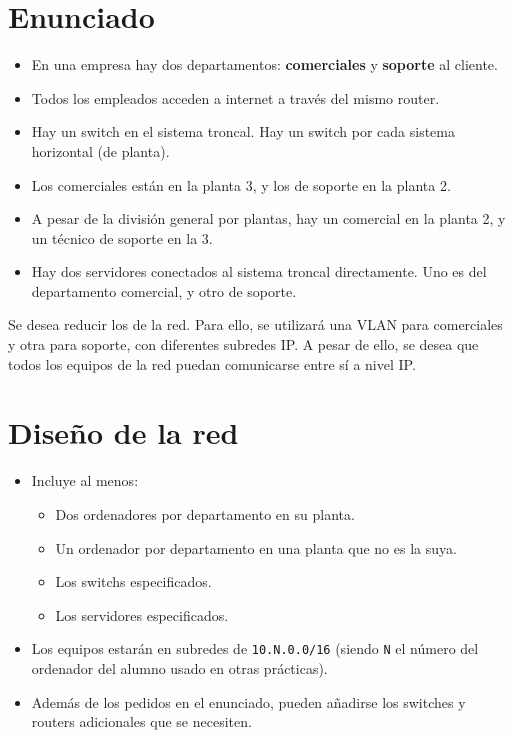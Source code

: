 \section{Enunciado}
\begin{itemize}
\item En una empresa hay dos departamentos: \textbf{comerciales} y \textbf{soporte} al cliente.
\item Todos los empleados acceden a internet a través del mismo router.
\item Hay un switch en el sistema troncal. Hay un switch por cada sistema horizontal (de planta).  
\item Los comerciales están en la planta 3, y los de soporte en la planta 2.
\item A pesar de la división general por plantas, hay un comercial en la planta 2, y un técnico de soporte en la 3.
\item Hay dos servidores conectados al sistema troncal directamente. Uno es del departamento comercial, y otro de soporte.
\end{itemize}
Se desea reducir los  de la red. Para ello, se utilizará una VLAN para comerciales y otra para soporte, con diferentes subredes IP.
A pesar de ello, se desea que todos los equipos de la red puedan comunicarse entre sí a nivel IP.

\section{Diseño de la red}
\begin{itemize}
\item Incluye al menos:
  \begin{itemize}
  \item Dos ordenadores por departamento en su planta.
  \item Un ordenador por departamento en una planta que no es la suya.
  \item Los switchs especificados.
  \item Los servidores especificados.
  \end{itemize}
\item Los equipos estarán en subredes de \texttt{10.N.0.0/16} (siendo \texttt{N} el número del ordenador del alumno usado en otras prácticas).
\item Además de los pedidos en el enunciado, pueden añadirse los switches y routers adicionales que se necesiten.  
\end{itemize}

